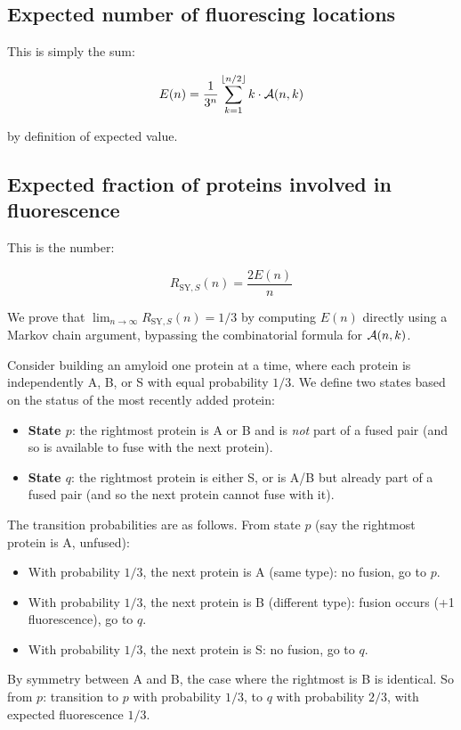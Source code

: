 \documentclass[referee,lineno,pdflatex,sn-mathphys-ay]{sn-jnl}
\DeclarePairedDelimiter\floor{\lfloor}{\rfloor}
\newcommand{\cA}{ {\cal A} }
\begin{document}
\subsection{Expected number of fluorescing locations}

This is simply the sum:

\[
    E(n) = \frac{1}{3^n}\sum_{k=1}^{\floor{n/2}} k \cdot \cA(n,k)
\]

by definition of expected value.

\subsection{Expected fraction of proteins involved in fluorescence}\label{subsec:s3-Eq}

This is the number:

\[
    R_{\text{SY},S}(n) = \frac{2E(n)}{n}
\]

We prove that $\lim_{n \to \infty} R_{\text{SY},S}(n) = 1/3$ by computing $E(n)$ directly using a Markov chain argument, bypassing the combinatorial formula for $\cA(n,k)$.

Consider building an amyloid one protein at a time, where each protein is independently A, B, or S with equal probability $1/3$. We define two states based on the status of the most recently added protein:
\begin{itemize}
\item \textbf{State $p$}: the rightmost protein is A or B and is \textit{not} part of a fused pair (and so is available to fuse with the next protein).
\item \textbf{State $q$}: the rightmost protein is either S, or is A/B but already part of a fused pair (and so the next protein cannot fuse with it).
\end{itemize}

The transition probabilities are as follows. From state $p$ (say the rightmost protein is A, unfused):
\begin{itemize}
\item With probability $1/3$, the next protein is A (same type): no fusion, go to $p$.
\item With probability $1/3$, the next protein is B (different type): fusion occurs (+1 fluorescence), go to $q$.
\item With probability $1/3$, the next protein is S: no fusion, go to $q$.
\end{itemize}
By symmetry between A and B, the case where the rightmost is B is identical. So from $p$: transition to $p$ with probability $1/3$, to $q$ with probability $2/3$, with expected fluorescence $1/3$.
\end{document}
